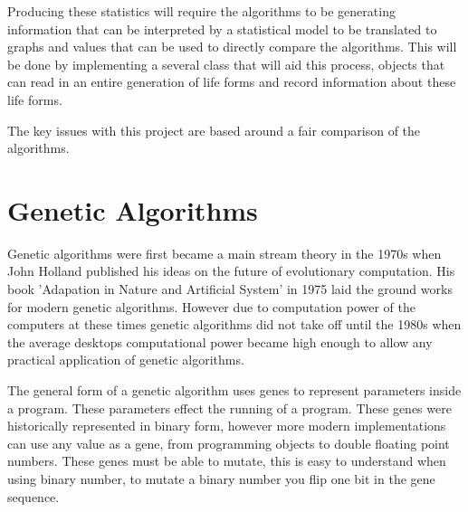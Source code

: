 \documentclass[12pt]{article}
\begin{document}
Producing these statistics will require the algorithms to be generating information that can be interpreted by a statistical model to be translated to graphs and values that can be
used to directly compare the algorithms. This will be done by implementing a several class that will aid this process, objects that can read in an entire generation of life forms
and record information about these life forms. 


The key issues with this project are based around a fair comparison of the algorithms. 

\section{Genetic Algorithms}

Genetic algorithms were first became a main stream theory in the 1970s when John Holland published his ideas on the future of evolutionary 
computation. His book 'Adapation in Nature and Artificial System' in 1975 laid the ground works for modern genetic algorithms. However due to computation
power of the computers at these times genetic algorithms did not take off until the 1980s when the average desktops computational power became
high enough to allow any practical application of genetic algorithms.

The general form of a genetic algorithm uses genes to represent parameters inside a program.
These parameters effect the running of a program.
These genes were historically represented in binary form, however more modern implementations can use any value as a gene, from programming objects to double floating point numbers.
These genes must be able to mutate, this is easy to understand when using binary number, to mutate a binary number you flip one bit in the gene sequence. 
\end{document}
